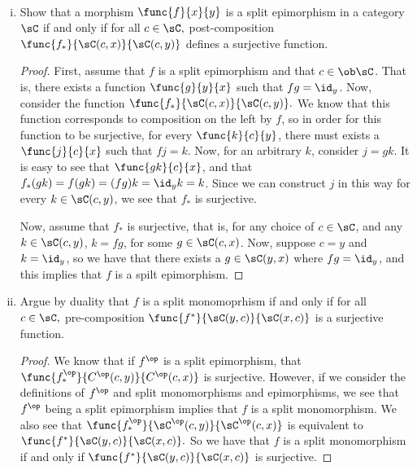 \documentclass[../../main]{subfiles}
\begin{document}
\paragraph{}
\begin{exercise}\leavevmode
	\begin{enumerate}[(i)]
	\item Show that a morphism \( \func{f}{x}{y} \) is a split epimorphism
		in a category \( \sC \) if and only if for all \( c\in \sC,\)
		post-composition \( \func{f_*}{\sC(c,x)}{\sC(c,y)} \) defines a
		surjective function.
	\begin{proof}
		 First, assume that \(f\) is a split epimorphism and that \(c \in
		 \ob\sC\). That is, there exists a function \(\func{g}{y}{x}\) such that
		 \(fg = \id_y\). Now, consider the function
		 \(\func{f_*}{\sC(c,x)}{\sC(c,y)}.\) We know that this function
		 corresponds to composition on the left by \(f\), so in order for this
		 function to be surjective, for every \(\func{k}{c}{y}\), there must
		 exists a \(\func{j}{c}{x}\) such that \(fj = k\). Now, for an arbitrary
		 \(k\), consider \(j = gk\). It is easy to see that \(\func{gk}{c}{x}\),
		 and that \(f_*(gk) = f(gk) = (fg)k = \id_yk = k\). Since we can construct
		 \(j\) in this way for every \(k \in \sC(c,y)\), we see that \(f_*\)
		 is surjective.

		Now, assume that \(f_*\) is surjective, that is, for any choice of \(c
		\in \sC\),  and any \(k \in \sC(c,y)\), \(k = fg\), for some \(g \in
		\sC(c,x)\). Now, suppose \(c = y\) and \(k = \id_y\), so we have that
		there exists a \(g \in \sC(y,x)\) where \(fg = \id_y\), and this implies
		that \(f\) is a spilt epimorphism.
	\end{proof}

	\item Argue by duality that \(f\) is a split monomoprhism if and
		only if for all \(c\in\sC,\) pre-composition
		\(\func{f^*}{\sC(y,c)}{\sC(x,c)}\) is a surjective function.
	\begin{proof}
		We know that if \(f^{\op}\) is a split epimorphism, that
		\(\func{f_{*}^{\op}}{C^{\op}(c,y)}{C^{\op}(c,x)}\) is surjective.
		However, if we consider the definitions of \(f^{\op}\) and split
		monomorphisms and epimorphisms, we see that \(f^{\op}\) being a split
		epimorphism implies that \(f\) is a split monomorphism. We also see that
		\(\func{f_{*}^{\op}}{\sC^{\op}(c,y)}{\sC^{\op}(c,x)}\) is equivalent to
		\(\func{f^{*}}{\sC(y,c)}{\sC(x,c)}.\) So we have that \(f\) is a split
		monomorphism if and only if \(\func{f^{*}}{\sC(y,c)}{\sC(x,c)}\) is
		surjective.
	\end{proof}
\end{enumerate}
\end{exercise}
\end{document}
